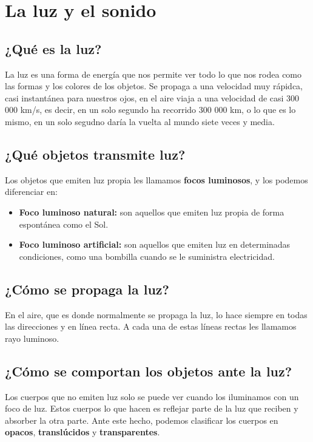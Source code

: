 \chapter{La luz y el sonido}

\section{¿Qué es la luz?}

La luz es una forma de energía que nos permite ver todo lo que nos rodea como las formas y los colores de los objetos. Se propaga a una velocidad muy rápidca, casi instantánea para nuestros ojos, en el aire viaja a una velocidad de casi 300 000 km/s, es decir, en un solo segundo ha recorrido 300 000 km, o lo que es lo mismo, en un solo segudno daría la vuelta al mundo siete veces y media.

\section{¿Qué objetos transmite luz?}

Los objetos que emiten luz propia les llamamos \textbf{focos luminosos}, y los podemos diferenciar en:

\begin{itemize}
\item \textbf{Foco luminoso natural:} son aquellos que emiten luz propia de forma espontánea como el Sol. 

\item \textbf{Foco luminoso artificial:} son aquellos que emiten luz en determinadas condiciones, como una bombilla cuando se le suministra electricidad.

\end{itemize}


\section{¿Cómo se propaga la luz?}

En el aire, que es donde normalmente se propaga la luz, lo hace siempre en todas las direcciones y en línea recta. A cada una de estas líneas rectas les llamamos rayo luminoso.


\section{¿Cómo se comportan los objetos ante la luz?}

Los cuerpos que no emiten luz solo se puede ver cuando los iluminamos con un foco de luz. Estos cuerpos lo que hacen es reflejar parte de la luz que reciben y absorber la otra parte. Ante este hecho, podemos clasificar los cuerpos en \textbf{opacos}, \textbf{translúcidos} y \textbf{transparentes}.

